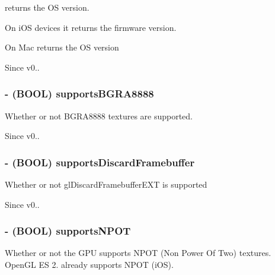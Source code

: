 returns the O\-S version.
\begin{DoxyItemize}
\item On i\-O\-S devices it returns the firmware version.
\item On Mac returns the O\-S version
\end{DoxyItemize}

\begin{DoxySince}{Since}
v0.. 
\end{DoxySince}
\hypertarget{interface_c_c_configuration_a7bf4ed17273b9cf0e24333444bf03bb9}{
\subsubsection[{supports\-B\-G\-R\-A8888}]{\setlength{\rightskip}{0pt plus 5cm}-\/ (B\-O\-O\-L) {\bf supports\-B\-G\-R\-A8888}}}\label{interface_c_c_configuration_a7bf4ed17273b9cf0e24333444bf03bb9}
Whether or not B\-G\-R\-A8888 textures are supported.

\begin{DoxySince}{Since}
v0.. 
\end{DoxySince}
\hypertarget{interface_c_c_configuration_a458fe46160b0950264f13aecd60ecf60}{
\subsubsection[{supports\-Discard\-Framebuffer}]{\setlength{\rightskip}{0pt plus 5cm}-\/ (B\-O\-O\-L) {\bf supports\-Discard\-Framebuffer}}}\label{interface_c_c_configuration_a458fe46160b0950264f13aecd60ecf60}
Whether or not gl\-Discard\-Framebuffer\-E\-X\-T is supported

\begin{DoxySince}{Since}
v0.. 
\end{DoxySince}
\hypertarget{interface_c_c_configuration_a9de282307e774c7274bead01371c242e}{
\subsubsection[{supports\-N\-P\-O\-T}]{\setlength{\rightskip}{0pt plus 5cm}-\/ (B\-O\-O\-L) {\bf supports\-N\-P\-O\-T}}}\label{interface_c_c_configuration_a9de282307e774c7274bead01371c242e}
Whether or not the G\-P\-U supports N\-P\-O\-T (Non Power Of Two) textures. Open\-G\-L E\-S 2. already supports N\-P\-O\-T (i\-O\-S).

